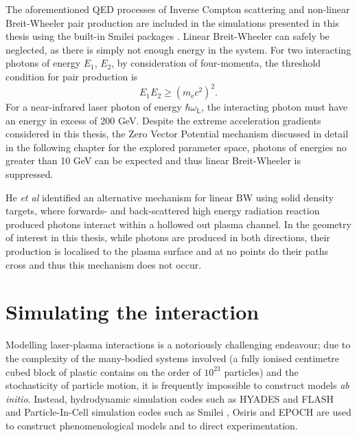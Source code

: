 
The aforementioned QED processes of Inverse Compton scattering and non-linear Breit-Wheeler pair production are included in the simulations presented in this thesis using the built-in Smilei packages \cite{derouillatSmileiCollaborativeOpensource2018}. Linear Breit-Wheeler can safely be neglected, as there is simply not enough energy in the system. For two interacting photons of energy $E_1$, $E_2$, by consideration of four-momenta, the threshold condition for pair production is 
\begin{equation}
	E_1E_2 \ge (m_\mathrm{e}c^2)^2.
\end{equation}
For a near-infrared laser photon of energy $\hbar \omega_\mathrm{L}$, the interacting photon must have an energy in excess of 200 GeV. Despite the extreme acceleration gradients considered in this thesis, the Zero Vector Potential mechanism discussed in detail in the following chapter for the explored parameter space, photons of energies no greater than 10 GeV can be expected and thus linear Breit-Wheeler is suppressed.

He \textit{et al} \cite{heSinglelaserSchemeObservation2021} identified an alternative mechanism for linear \ac{BW} using solid density targets, where forwards- and back-scattered high energy radiation reaction produced photons interact within a hollowed out plasma channel. In the geometry of interest in this thesis, while photons are produced in both directions, their production is localised to the plasma surface and at no points do their paths cross and thus this mechanism does not occur.

\section{Simulating the interaction}
Modelling laser-plasma interactions is a notoriously challenging endeavour; due to the complexity of the many-bodied systems involved (a fully ionised centimetre cubed block of plastic contains on the order of $10^23$ particles) and the stochasticity of particle motion, it is frequently impossible to construct models \textit{ab initio}. Instead, hydrodynamic simulation codes such as HYADES \cite{larsenHYADESPlasmaHydrodynamics1994} and FLASH \cite{fryxellFLASHAdaptiveMesh2000} and Particle-In-Cell simulation codes such as Smilei \cite{derouillatSmileiCollaborativeOpensource2018}, Osiris \cite{fonsecaOSIRISThreeDimensionalFully2002} and EPOCH \cite{bennett2017users} are used to construct phenomenological models and to direct experimentation. 


